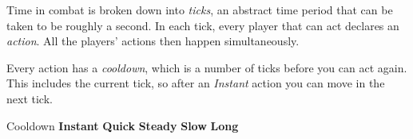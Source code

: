 
Time in combat is broken down into \emph{ticks}, an abstract time period that can be taken to be roughly a second. In each tick, every player that can act declares an \emph{action}. All the players' actions then happen simultaneously.

Every action has a \emph{cooldown}, which is a number of ticks before you can act again. This includes the current tick, so after an \emph{Instant} action you can move in the next tick.

\begin{abstractsection}{Cooldown}
  \textbf{Instant}  \hfill
  \textbf{Quick}    \hfill
  \textbf{Steady}   \hfill
  \textbf{Slow}     \hfill
  \textbf{Long}     \hspace*{-5ex} %
\end{abstractsection}
